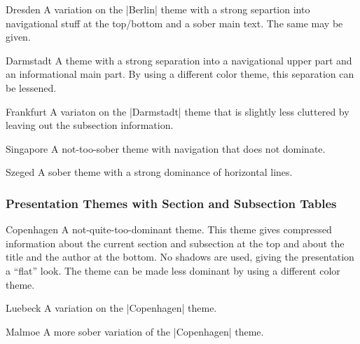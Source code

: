 \begin{themeexample}{Dresden}
  A variation on the |Berlin| theme with a strong separtion into
  navigational stuff at the top/bottom and a sober main text. The same
   may be given.  
\end{themeexample}


\begin{themeexample}{Darmstadt}
  A theme with a strong separation into a navigational upper part and
  an informational main part. By using a different color theme, this
  separation can be lessened. 
\end{themeexample}

\begin{themeexample}{Frankfurt}
  A variaton on the |Darmstadt| theme that is slightly less cluttered
  by leaving out the subsection information.
\end{themeexample}

\begin{themeexample}{Singapore}
  A not-too-sober theme with navigation that does not dominate.
\end{themeexample}

\begin{themeexample}{Szeged}
  A sober theme with a strong dominance of horizontal lines. 
\end{themeexample}




\subsubsection{Presentation Themes with Section and Subsection Tables}

\begin{themeexample}{Copenhagen}
  A not-quite-too-dominant theme. This theme gives compressed
  information about the current section and subsection at the top and
  about the title and the author at the bottom. No shadows are used,
  giving the presentation a ``flat'' look. The theme can be made less
  dominant by using a different color theme.
\end{themeexample}


\begin{themeexample}{Luebeck}
  A variation on the |Copenhagen| theme.
\end{themeexample}

\begin{themeexample}{Malmoe}
  A more sober variation of the |Copenhagen| theme.
\end{themeexample}



